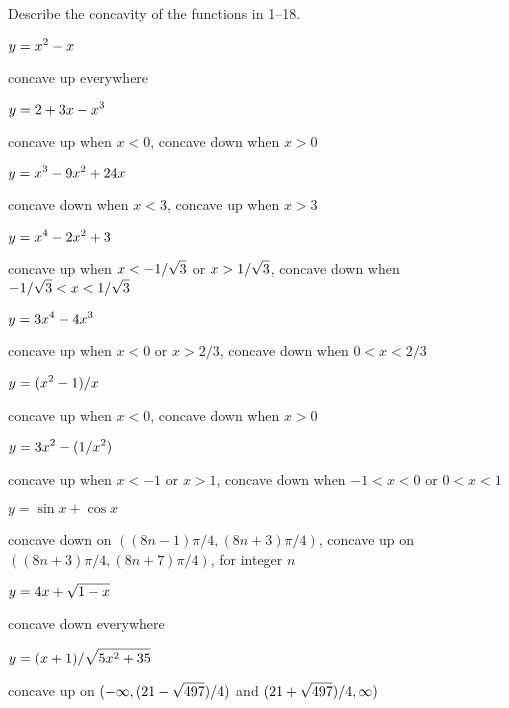\begin{exercises}
Describe the concavity of the functions in 1--18.

\twocol

\exercise $\displaystyle y=x^2-x$ 
\begin{answer} concave up everywhere
\end{answer}

\exercise $\displaystyle y=2+3x-x^3$ 
\begin{answer} concave up when $x<0$, concave down when $x>0$
\end{answer}

\exercise $\displaystyle y=x^3-9x^2+24x$
\begin{answer} concave down when $x<3$, concave up when $x>3$
\end{answer}

\exercise $\displaystyle y=x^4-2x^2+3$ 
\begin{answer} concave up when $\displaystyle x<-1/\sqrt3$ or $\displaystyle x>1/\sqrt3$,
concave down when $\displaystyle -1/\sqrt3<x<1/\sqrt3$
\end{answer}

\exercise $\displaystyle y=3x^4-4x^3$
\begin{answer} concave up when $x<0$ or $x>2/3$,
concave down when $0<x<2/3$
\end{answer}

\exercise $\displaystyle y=(x^2-1)/x$
\begin{answer} concave up when $x<0$, concave down when $x>0$
\end{answer}

\exercise $\displaystyle y=3x^2-(1/x^2)$ 
\begin{answer} concave up when $x<-1$ or $x>1$, concave down when
$-1<x<0$ or $0<x<1$
\end{answer}

\exercise $y=\sin x + \cos x$ 
\begin{answer} concave down on $((8n-1)\pi/4,(8n+3)\pi/4)$,
concave up on $((8n+3)\pi/4,(8n+7)\pi/4)$, for integer $n$
\end{answer}

\exercise $\displaystyle y = 4x+\sqrt{1-x}$
\begin{answer} concave down everywhere
\end{answer}

\exercise $\displaystyle y = (x+1)/\sqrt{5x^2 + 35}$
\begin{answer} concave up on $\displaystyle (-\infty,(21-\sqrt{497})/4)$ and 
$\displaystyle (21+\sqrt{497})/4,\infty)$
\end{answer}


\end{exercises}
